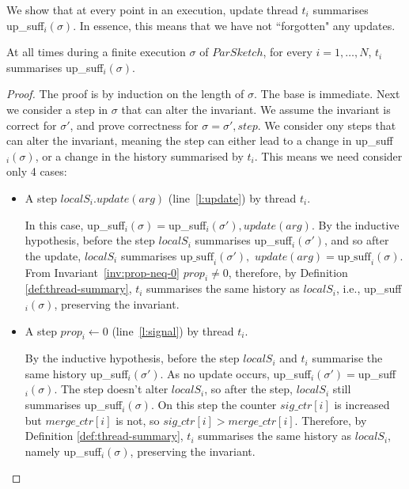 We show that at every point in an execution, update thread $t_i$ summarises up\_suff$_i(\sigma)$. 
In essence, this means that we have not ``forgotten" any updates.
\begin{invariant}
    At all times during a finite execution $\sigma$ of $ParSketch$, for every $i=1,\dots,N$, $t_i$ summarises up\_suff$_i(\sigma)$.
    \label{inv:update-thread-summary}
\end{invariant}
\begin{proof}
    The proof is by induction on the length of $\sigma$. The base is immediate.
    Next we consider a step in $\sigma$ that can alter the invariant. We assume the invariant is correct
    for $\sigma'$, and prove correctness for $\sigma=\sigma',step$. We consider ony steps that
    can alter the invariant, meaning the step can 
    either lead to a change in up\_suff$_i(\sigma)$, or a change in the history summarised by $t_i$. This
    means we need consider only 4 cases:
    \begin{itemize}

        \item A step $localS_i.update(arg)$ (line~\ref{l:update}) by thread $t_i$.

        In this case, up\_suff$_i(\sigma)=$up\_suff$_i(\sigma'),update(arg)$.
        By the inductive hypothesis, before the step $localS_i$ summarises up\_suff$_i(\sigma')$,
        and so after the update, $localS_i$ summarises $\text{up\_suff}_i(\sigma'),$ \linebreak $update(arg)=\text{up\_suff}_i(\sigma)$.
        From Invariant~\ref{inv:prop-neq-0} $prop_i \neq 0$, therefore, by Definition \ref{def:thread-summary}, $t_i$ summarises
        the same history as $localS_i$,
        i.e., up\_suff$_i(\sigma)$, preserving the invariant.

        \item A step $prop_i \leftarrow 0$ (line~\ref{l:signal}) by thread $t_i$.
        
        By the inductive hypothesis, before the step $localS_i$ and $t_i$ summarise the same
        history up\_suff$_i(\sigma')$.
        As no update occurs, up\_suff$_i(\sigma')$$=$up\_suff$_i(\sigma)$. The step
        doesn't alter $localS_i$, so after the step, $localS_i$ still summarises
        up\_suff$_i(\sigma)$. On this step the counter $sig\_ctr[i]$ is increased but $merge\_ctr[i]$
        is not, so $sig\_ctr[i]>merge\_ctr[i]$.
        Therefore, by Definition \ref{def:thread-summary}, $t_i$ summarises the same history as $localS_i$,
        namely up\_suff$_i(\sigma)$, preserving the invariant.


\end{itemize}
\end{proof}
